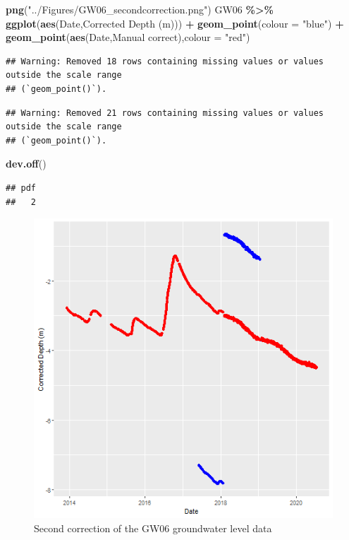 \documentclass[
]{article}
\newenvironment{Shaded}{\begin{snugshade}}{\end{snugshade}}
\newcommand{\AttributeTok}[1]{\textcolor[rgb]{0.13,0.29,0.53}{#1}}
\newcommand{\FunctionTok}[1]{\textcolor[rgb]{0.13,0.29,0.53}{\textbf{#1}}}
\newcommand{\NormalTok}[1]{#1}
\newcommand{\SpecialCharTok}[1]{\textcolor[rgb]{0.81,0.36,0.00}{\textbf{#1}}}
\newcommand{\StringTok}[1]{\textcolor[rgb]{0.31,0.60,0.02}{#1}}
\begin{document}
\begin{Shaded}
\begin{Highlighting}[]
\FunctionTok{png}\NormalTok{(}\StringTok{"../Figures/GW06\_secondcorrection.png"}\NormalTok{)}
\NormalTok{GW06 }\SpecialCharTok{\%\textgreater{}\%}
  \FunctionTok{ggplot}\NormalTok{(}\FunctionTok{aes}\NormalTok{(Date,}\StringTok{\textasciigrave{}}\AttributeTok{Corrected Depth (m)}\StringTok{\textasciigrave{}}\NormalTok{)) }\SpecialCharTok{+} 
  \FunctionTok{geom\_point}\NormalTok{(}\AttributeTok{colour =} \StringTok{"blue"}\NormalTok{) }\SpecialCharTok{+}
  \FunctionTok{geom\_point}\NormalTok{(}\FunctionTok{aes}\NormalTok{(Date,}\StringTok{\textasciigrave{}}\AttributeTok{Manual correct}\StringTok{\textasciigrave{}}\NormalTok{),}\AttributeTok{colour =} \StringTok{"red"}\NormalTok{)}
\end{Highlighting}
\end{Shaded}

\begin{verbatim}
## Warning: Removed 18 rows containing missing values or values outside the scale range
## (`geom_point()`).
\end{verbatim}

\begin{verbatim}
## Warning: Removed 21 rows containing missing values or values outside the scale range
## (`geom_point()`).
\end{verbatim}

\begin{Shaded}
\begin{Highlighting}[]
\FunctionTok{dev.off}\NormalTok{()}
\end{Highlighting}
\end{Shaded}

\begin{verbatim}
## pdf 
##   2
\end{verbatim}

\begin{figure}
\includegraphics[width=0.8\linewidth]{../Figures/GW06_secondcorrection} \caption{Second correction of the GW06 groundwater level data}\label{fig:secondcorr-GW06}
\end{figure}
\end{document}
